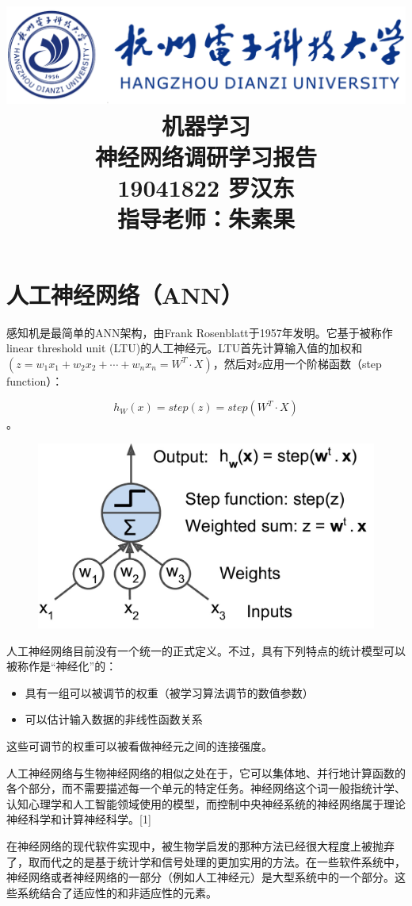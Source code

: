 \documentclass[UTF8]{ctexart}
\title{
	\includegraphics[scale = 1]{HDU.png}\\
    \vspace{1in}
    \textmd{ \Huge\textbf{机器学习}}\\
    \textmd{\textbf{神经网络调研学习报告}}\\
   	\vspace{3.5in}
	\textmd{19041822 罗汉东}\\
	\textmd{指导老师：朱素果}\\
}
\begin{document}
\maketitle
\newpage
\tableofcontents
\newpage
\section{人工神经网络（ANN）}
感知机是最简单的ANN架构，由Frank Rosenblatt于1957年发明。它基于被称作linear threshold unit (LTU)的人工神经元。LTU首先计算输入值的加权和$ (z=w_1x_1+w_2x_2+⋯+w_nx_n=W^T⋅X)$，然后对z应用一个阶梯函数（step function）：

$$h_W(x)=step(z)=step(W^T⋅X)$$。
\begin{figure}[H]
\centering
\includegraphics[scale = 0.4]{ANN.png}
\end{figure}
人工神经网络目前没有一个统一的正式定义。不过，具有下列特点的统计模型可以被称作是“神经化”的：
\begin{itemize}
    \item 具有一组可以被调节的权重（被学习算法调节的数值参数）
    \item 可以估计输入数据的非线性函数关系
\end{itemize}
这些可调节的权重可以被看做神经元之间的连接强度。

人工神经网络与生物神经网络的相似之处在于，它可以集体地、并行地计算函数的各个部分，而不需要描述每一个单元的特定任务。神经网络这个词一般指统计学、认知心理学和人工智能领域使用的模型，而控制中央神经系统的神经网络属于理论神经科学和计算神经科学。[1]

在神经网络的现代软件实现中，被生物学启发的那种方法已经很大程度上被抛弃了，取而代之的是基于统计学和信号处理的更加实用的方法。在一些软件系统中，神经网络或者神经网络的一部分（例如人工神经元）是大型系统中的一个部分。这些系统结合了适应性的和非适应性的元素。
\end{document}
